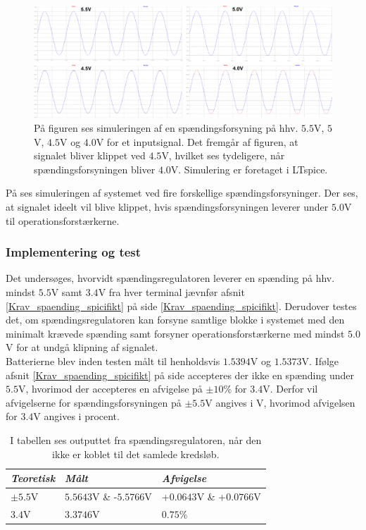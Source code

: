 \begin{figure}[H]
	\centering
	\includegraphics[scale=0.2]{figures/cProblemloesning/Spaendingsforsyning2.PNG}
	\caption{På figuren ses simuleringen af en spændingsforsyning på hhv. $5.5$V, $5$V, $4.5$V og $4.0$V for et inputsignal. Det fremgår af figuren, at signalet bliver klippet ved $4.5$V, hvilket ses tydeligere, når spændingsforsyningen bliver $4.0$V. Simulering er foretaget i LTspice.}
	\label{fig:spaendingsforsyning_graf}
\end{figure}
På  ses simuleringen af systemet ved fire forskellige spændingsforsyninger. Der ses, at signalet ideelt vil blive klippet, hvis spændingsforsyningen leverer under $5.0$V til operationsforstærkerne.

\subsubsection{Implementering og test}
Det undersøges, hvorvidt spændingsregulatoren leverer en spænding på hhv. mindst $5.5$V samt $3.4$V fra hver terminal jævnfør afsnit \ref{Krav_spaending_spicifikt} på side \ref{Krav_spaending_spicifikt}. Derudover testes det, om spændingsregulatoren kan forsyne samtlige blokke i systemet med den minimalt krævede spænding samt forsyner operationsforstærkerne med mindst $5.0$V for at undgå klipning af signalet. \\
Batterierne blev inden testen målt til henholdsvis $1.5394$V og $1.5373$V. Ifølge afsnit \ref{Krav_spaending_spicifikt} på side \pageref{Krav_spaending_spicifikt} accepteres der ikke en spænding under $5.5$V, hvorimod der accepteres en afvigelse på $\pm10\%$ for $3.4$V. Derfor vil afvigelserne for spændingsforsyningen på $\pm5.5$V angives i V, hvorimod afvigelsen for $3.4$V angives i procent.
\begin{table}[H]
	\centering
	\begin{tabular}{|l|l|l|}
		\hline
		\textit{Teoretisk} & \textit{Målt} & \textit{Afvigelse} \\ \hline
		$\pm5.5$V          &     $5.5643$V \& -$5.5766$V   &     +$0.0643$V \& +$0.0766$V                 \\ \hline
		$3.4$V             &     $3.3746$V                 &      $0.75\%$                                \\ \hline
	\end{tabular}
	\caption{I tabellen ses outputtet fra spændingsregulatoren, når den ikke er koblet til det samlede kredsløb.}
	\label{tab:spaending_resultat}
\end{table}
 
